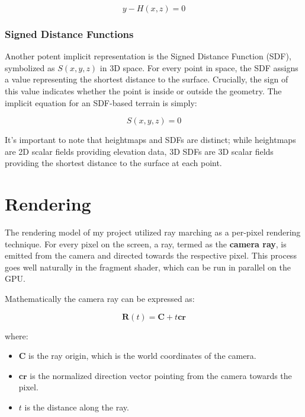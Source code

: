 \begin{equation}
y - H(x,z) = 0
\end{equation}

\subsubsection{Signed Distance Functions}
\label{SDF}

Another potent  implicit representation is the Signed Distance Function (SDF), symbolized as $S(x,y,z)$ in 3D space. For every point in space, the SDF assigns a value representing the shortest distance to the surface. Crucially, the sign of this value indicates whether the point is inside or outside the geometry. The implicit equation for an SDF-based terrain is simply:

\begin{equation}
S(x,y,z) = 0 
\end{equation}

It's important to note that heightmaps and SDFs are distinct; while heightmaps are 2D scalar fields providing elevation data, 3D SDFs are 3D scalar fields providing the shortest distance to the surface at each point. 


\section{Rendering}
\label{Rendering}

The rendering model of my project utilized ray marching as a per-pixel rendering technique. For every pixel on the screen, a ray, termed as the \textbf{camera ray}, is emitted from the camera and directed towards the respective pixel. This process goes well naturally in the fragment shader, which can be run in parallel on the GPU.

Mathematically the camera ray can be expressed as:

\begin{equation}
 \mathbf{R}(t) = \mathbf{C} + t\mathbf{cr} 
\end{equation}

where:
\begin{itemize}
    \item $\mathbf{C}$ is the ray origin, which is the world coordinates of the camera.
    \item $\mathbf{cr}$ is the normalized direction vector pointing from the camera towards the pixel.
    \item $t$ is the distance along the ray.
\end{itemize}

